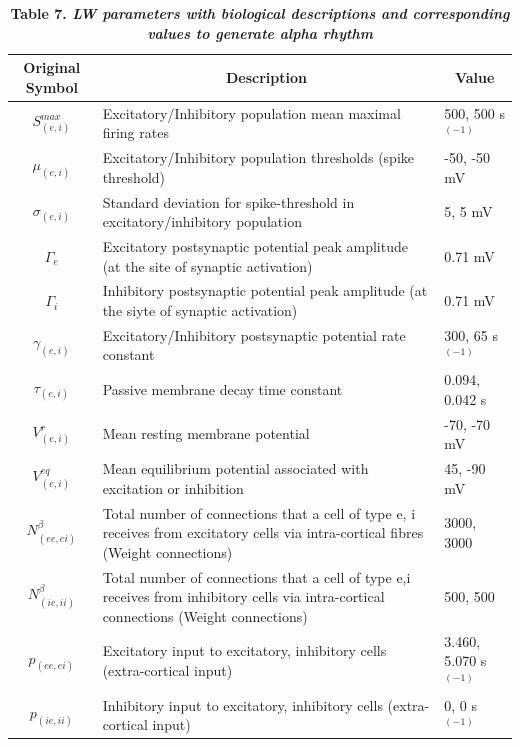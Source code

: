 \documentclass[12pt,twoside]{article}
\begin{document}
\begin{table}[H]
\begin{tabular}{|c|p{10cm}|p{2.5cm}| }
\hline
Original Symbol & \multicolumn{1}{|c|}{Description} & \multicolumn{1}{c|}{Value}  \\ 
 \hline
$S_{(e,i)}^{max}$ & Excitatory/Inhibitory population mean maximal firing rates & 500, 500 s$^{(-1)}$ \\ 
 \hline
$\mu_{(e,i)}$ & Excitatory/Inhibitory population thresholds (spike threshold) & -50, -50 mV \\ 
 \hline
$\sigma_{(e,i)}$ & Standard deviation for spike-threshold in excitatory/inhibitory population & 5, 5 mV\\
 \hline
$\Gamma_{e}$ & Excitatory postsynaptic potential peak amplitude (at the site of synaptic activation) & 0.71 mV\\%
 \hline
$\Gamma_{i}$ & Inhibitory postsynaptic potential peak amplitude (at the siyte of synaptic activation)	& 0.71 mV \\%
 \hline
$\gamma_{(e,i)}$ & Excitatory/Inhibitory postsynaptic potential rate constant & 300, 65 s$^{(-1)}$\\
\hline
$\tau_{(e,i)}$ & Passive membrane decay time constant & 0.094, 0.042 s \\
\hline
$V_{(e,i)}^{r}$ & Mean resting membrane potential & -70, -70 mV\\
\hline
$V_{(e,i)}^{eq}$ & Mean equilibrium potential associated with excitation or inhibition & 45, -90 mV\\
\hline
$N_{(ee,ei)}^{\beta}$ & Total number of connections that a cell of type e, i receives from excitatory cells via intra-cortical fibres (Weight connections) & 3000, 3000\\
\hline
$N_{(ie,ii)}^{\beta}$ & Total number of connections that a cell of type e,i receives from inhibitory cells via intra-cortical connections (Weight connections) & 500, 500\\
\hline
$p_{(ee,ei)}$ & Excitatory input to excitatory, inhibitory cells (extra-cortical input) & 3.460, 5.070 s$^{(-1)}$\\
\hline
$p_{(ie,ii)}$ & Inhibitory input to excitatory, inhibitory cells (extra-cortical input) &	0, 0  s$^{(-1)}$\\
\hline
\end{tabular}
\caption*{\textbf{Table 7.  \textit{LW parameters with biological descriptions and corresponding values to generate alpha rhythm}}}
\label{tab:Liley}
\end{table}
\end{document}

